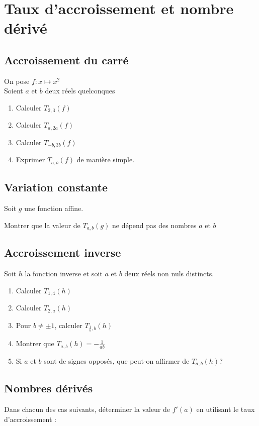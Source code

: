 \documentclass[oneside,12pt]{article}          %
\begin{document}
\section{Taux d'accroissement et nombre dérivé}

\subsection{Accroissement du carré}
On pose $f: x \mapsto x^2$\\
Soient $a$ et $b$ deux réels quelconques
\begin{enumerate}
    \item Calculer $T_{2,3}(f)$
    \item Calculer $T_{a,2a}(f)$
    \item Calculer $T_{-b,3b}(f)$
    \item Exprimer $T_{a,b}(f)$ de manière simple.
\end{enumerate}


\subsection{Variation constante}
Soit $g$ une fonction affine.

Montrer que la valeur de $T_{a,b}(g)$ ne dépend pas des nombres $a$ et $b$


\subsection{Accroissement inverse}
Soit $h$ la fonction inverse et soit $a$ et $b$ deux réels non nuls distincts.
\begin{enumerate}
    \item Calculer $T_{1,4}(h)$
    \item Calculer $T_{2,a}(h)$
    \item Pour $b \neq \pm 1$, calculer $T_{\frac{1}{b},b}(h)$
    \item Montrer que $T_{a,b}(h) = -\frac{1}{ab}$
    \item Si $a$ et $b$ sont de signes opposés, que peut-on affirmer de $T_{a,b}(h)$?
\end{enumerate}

\subsection{Nombres dérivés}
Dans chacun des cas suivants, déterminer la valeur de $f'(a)$ en utilisant le taux d'accroissement :
\end{document}
